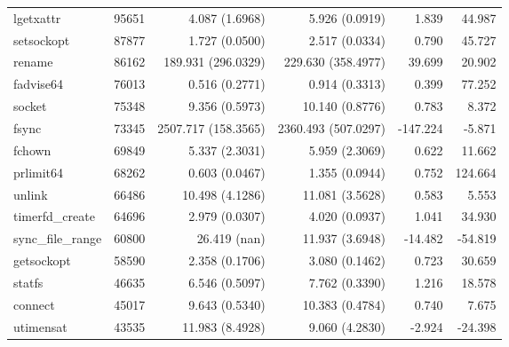 \begin{longtable}{>{\ttfamily}lrrrrr}
                      lgetxattr &      95651 &              4.087 (1.6968) &            5.926 (0.0919) &           1.839 &       44.987 \\
                     setsockopt &      87877 &              1.727 (0.0500) &            2.517 (0.0334) &           0.790 &       45.727 \\
                         rename &      86162 &          189.931 (296.0329) &        229.630 (358.4977) &          39.699 &       20.902 \\
                      fadvise64 &      76013 &              0.516 (0.2771) &            0.914 (0.3313) &           0.399 &       77.252 \\
                         socket &      75348 &              9.356 (0.5973) &           10.140 (0.8776) &           0.783 &        8.372 \\
                          fsync &      73345 &         2507.717 (158.3565) &       2360.493 (507.0297) &        -147.224 &       -5.871 \\
                         fchown &      69849 &              5.337 (2.3031) &            5.959 (2.3069) &           0.622 &       11.662 \\
                      prlimit64 &      68262 &              0.603 (0.0467) &            1.355 (0.0944) &           0.752 &      124.664 \\
                         unlink &      66486 &             10.498 (4.1286) &           11.081 (3.5628) &           0.583 &        5.553 \\
                timerfd\_create &      64696 &              2.979 (0.0307) &            4.020 (0.0937) &           1.041 &       34.930 \\
              sync\_file\_range &      60800 &                26.419 (nan) &           11.937 (3.6948) &         -14.482 &      -54.819 \\
                     getsockopt &      58590 &              2.358 (0.1706) &            3.080 (0.1462) &           0.723 &       30.659 \\
                         statfs &      46635 &              6.546 (0.5097) &            7.762 (0.3390) &           1.216 &       18.578 \\
                        connect &      45017 &              9.643 (0.5340) &           10.383 (0.4784) &           0.740 &        7.675 \\
                      utimensat &      43535 &             11.983 (8.4928) &            9.060 (4.2830) &          -2.924 &      -24.398 \\

\end{longtable}
